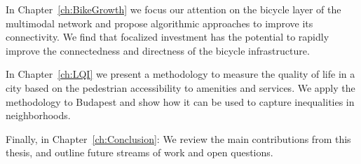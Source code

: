 In Chapter~\ref{ch:BikeGrowth} we focus our attention on the bicycle layer of the multimodal network and propose algorithmic approaches to improve its connectivity. We find that focalized investment has the potential to rapidly improve the connectedness and directness of the bicycle infrastructure.

In Chapter~\ref{ch:LQI} we present a methodology to measure the quality of life in a city based on the pedestrian accessibility to amenities and services. We apply the methodology to Budapest and show how it can be used to capture inequalities in neighborhoods.

Finally, in Chapter~\ref{ch:Conclusion}: We review the main contributions from this thesis, and outline future streams of work and open questions. 